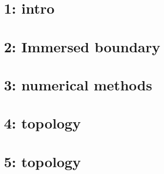 \documentclass[12pt]{book}
\begin{document}
\chapter{1: intro}







\chapter{2: Immersed boundary}







\chapter{3: numerical methods}











\chapter{4: topology}







\chapter{5: topology}






\end{document}
